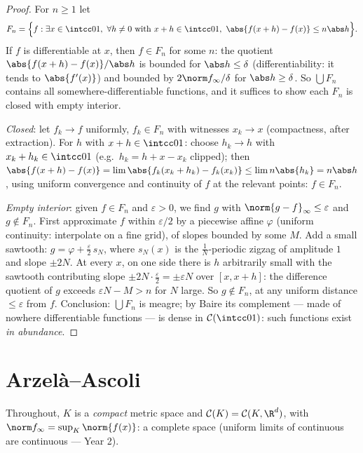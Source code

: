 \begin{proof}
For $n \geq 1$ let
\[
F_n = \Bigl\{f : \exists x \in \intcc01,\
\forall h \neq 0 \text{ with } x + h \in \intcc01,\
\abs{f(x+h) - f(x)} \leq n\abs h \Bigr\}.
\]
If $f$ is differentiable at $x$, then $f \in F_n$ for some $n$:
the quotient $\abs{f(x+h)-f(x)}/\abs h$ is bounded for $\abs h
\leq \delta$ (differentiability: it tends to
$\abs{f'(x)}$) and bounded by $2\norm f_\infty/\delta$ for
$\abs h \geq \delta$. So $\bigcup F_n$ contains
all somewhere-differentiable functions, and it suffices to show
each $F_n$ is closed with empty interior.

\emph{Closed}: let $f_k \to f$ uniformly, $f_k \in F_n$ with
witnesses $x_k \to x$ (compactness, after extraction). For $h$
with $x + h \in \intcc01$: choose $h_k \to h$ with $x_k + h_k
\in \intcc01$ (e.g.\ $h_k = h + x - x_k$ clipped); then
$\abs{f(x + h) - f(x)} = \lim \abs{f_k(x_k + h_k) - f_k(x_k)}
\leq \lim n\abs{h_k} = n\abs h$, using uniform convergence and
continuity of $f$ at the relevant points: $f \in F_n$.

\emph{Empty interior}: given $f \in F_n$ and $\varepsilon > 0$,
we find $g$ with $\norm{g - f}_\infty \leq \varepsilon$ and $g
\notin F_n$. First approximate $f$ within $\varepsilon/2$ by a
piecewise affine $\varphi$ (uniform continuity: interpolate on a
fine grid), of slopes bounded by some $M$. Add a small sawtooth:
$g = \varphi + \frac\varepsilon2\,s_N$, where $s_N(x)$ is the
$\frac1N$-periodic zigzag of amplitude $1$ and slope $\pm 2N$.
At every $x$, on one side there is $h$ arbitrarily small with
the sawtooth contributing slope $\pm 2N\cdot\frac\varepsilon2 =
\pm\varepsilon N$ over $[x, x+h]$: the difference quotient of
$g$ exceeds $\varepsilon N - M > n$ for $N$ large. So $g \notin
F_n$, at any uniform distance $\leq \varepsilon$ from $f$.
Conclusion: $\bigcup F_n$ is meagre; by Baire its complement
--- made of nowhere differentiable functions --- is dense in
$\mathcal C(\intcc01)$: such functions exist \emph{in
abundance}.
\end{proof}

\section{Arzel\`a--Ascoli}

Throughout, $K$ is a \emph{compact} metric space and $\mathcal
C(K) = \mathcal C(K, \R^d)$, with $\norm f_\infty = \sup_K
\norm{f(x)}$: a complete space (uniform limits of continuous
are continuous --- Year 2).

